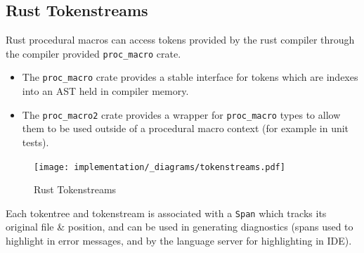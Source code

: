 \subsection{Rust Tokenstreams}
Rust procedural macros can access tokens provided by the rust compiler through the compiler provided \texttt{proc_macro} crate.
\begin{itemize}
    \setlength\itemsep{0em}
    \item The \texttt{proc_macro} crate provides a stable interface for tokens which are indexes into an AST held in compiler memory.
    \item The \texttt{proc_macro2} crate provides a wrapper for \texttt{proc_macro} types to allow them to be used outside of a procedural macro context (for example in unit tests).
\end{itemize}
\begin{figure}[h!]
    \centering
    \texttt{[image: implementation/\_diagrams/tokenstreams.pdf]}
    \caption{Rust Tokenstreams}
\end{figure}
\noindent
Each tokentree and tokenstream is associated with a \texttt{Span} which tracks its original file \& position,
and can be used in generating diagnostics (spans used to highlight in error messages, and by the language server for highlighting in IDE).
